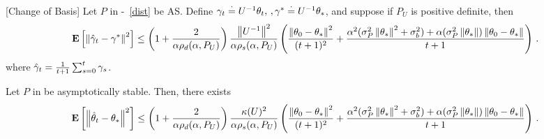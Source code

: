 \begin{theorem}\label{thm:simtran}[Change of Basis]
Let $P$ in -~\ref{dist} be AS. Define $\gamma_t\stackrel{\cdot}{=} U^{-1}\theta_t,\,,\gamma^*\stackrel{\cdot}{=} U^{-1}\theta_*$, and suppose if $P_U$ is positive definite, then
\begin{align*}
\mathbf{E}\left[\left\| \hat{\gamma}_t-\gamma^*\right\|^2\right]
\leq
\left(1+\frac2{\alpha\rho_d(\alpha,P_U)}\right)\frac{\left\| U^{-1}\right\|^2}{\alpha \rho_s(\alpha,P_U)}
\left(\frac{\left\| \theta_0-\theta_*\right\|^2}{(t+1)^2}+ \frac{\alpha^2(\sigma_P^2\left\| \theta_*\right\|^2+\sigma_b^2)+\alpha (\sigma_P^2\left\| \theta_*\right\|)\left\| \theta_0-\theta_*\right\|}{t+1} \right)\,.
\end{align*}
where $\hat{\gamma}_t=\frac{1}{t+1}\sum_{s=0}^t \gamma_s$.
\end{theorem}
\begin{corollary}\label{cor:as}
Let $P$ in  be asymptotically stable. Then, there exists
\begin{align*}
\mathbf{E}\left[\left\| \hat{\theta}_t-\theta_*\right\|^2\right]
\leq
\left(1+\frac2{\alpha\rho_d(\alpha,P_U)}\right)\frac{\kappa(U)^2}{\alpha \rho_s(\alpha,P_U)}
\left(\frac{\left\| \theta_0-\theta_*\right\|^2}{(t+1)^2}+ \frac{\alpha^2(\sigma_P^2\left\| \theta_*\right\|^2+\sigma_b^2)+\alpha (\sigma_P^2\left\| \theta_*\right\|)\left\| \theta_0-\theta_*\right\|}{t+1} \right)\,.
\end{align*}
\end{corollary}
